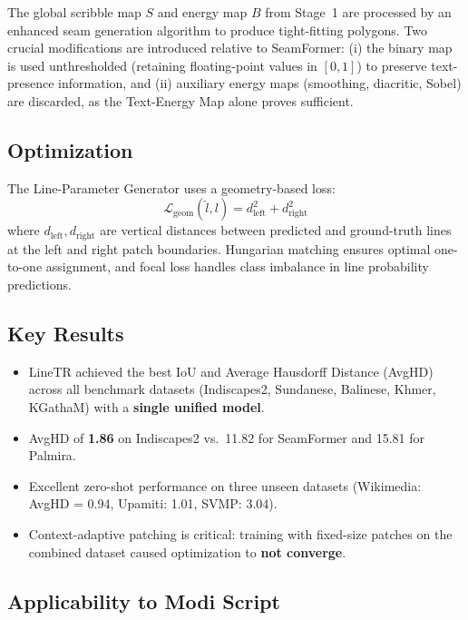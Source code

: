 \documentclass[11pt, a4paper]{article}
\begin{document}
The global scribble map $S$ and energy map $B$ from Stage~1 are processed by an enhanced seam generation algorithm to produce tight-fitting polygons. Two crucial modifications are introduced relative to SeamFormer: (i) the binary map is used unthresholded (retaining floating-point values in $[0, 1]$) to preserve text-presence information, and (ii) auxiliary energy maps (smoothing, diacritic, Sobel) are discarded, as the Text-Energy Map alone proves sufficient.

\subsection{Optimization}

The Line-Parameter Generator uses a geometry-based loss:
\begin{equation}
    \mathcal{L}_{\text{geom}}(\hat{l}, l) = d_{\text{left}}^2 + d_{\text{right}}^2
\end{equation}
where $d_{\text{left}}, d_{\text{right}}$ are vertical distances between predicted and ground-truth lines at the left and right patch boundaries. Hungarian matching ensures optimal one-to-one assignment, and focal loss handles class imbalance in line probability predictions.

\subsection{Key Results}

\begin{itemize}[leftmargin=1.5em]
    \item LineTR achieved the best IoU and Average Hausdorff Distance (AvgHD) across all benchmark datasets (Indiscapes2, Sundanese, Balinese, Khmer, KGathaM) with a \textbf{single unified model}.
    \item AvgHD of \textbf{1.86} on Indiscapes2 vs.\ 11.82 for SeamFormer and 15.81 for Palmira.
    \item Excellent zero-shot performance on three unseen datasets (Wikimedia: AvgHD = 0.94, Upamiti: 1.01, SVMP: 3.04).
    \item Context-adaptive patching is critical: training with fixed-size patches on the combined dataset caused optimization to \textbf{not converge}.
\end{itemize}

\subsection{Applicability to Modi Script}
\end{document}
